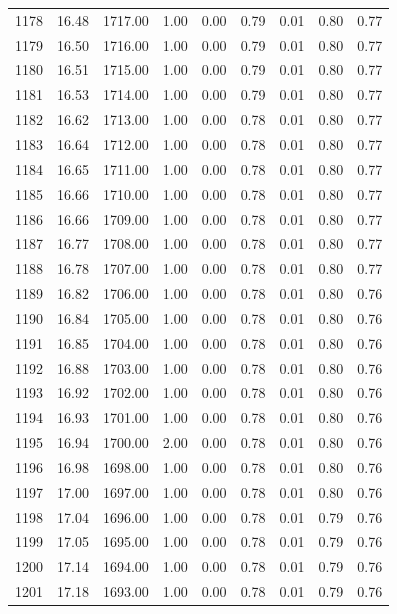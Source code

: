 \documentclass{article}\usepackage[]{graphicx}\usepackage[]{color}
\begin{document}
\begin{longtable}{rrrrrrrrr}
  1178 & 16.48 & 1717.00 & 1.00 & 0.00 & 0.79 & 0.01 & 0.80 & 0.77 \\ 
  1179 & 16.50 & 1716.00 & 1.00 & 0.00 & 0.79 & 0.01 & 0.80 & 0.77 \\ 
  1180 & 16.51 & 1715.00 & 1.00 & 0.00 & 0.79 & 0.01 & 0.80 & 0.77 \\ 
  1181 & 16.53 & 1714.00 & 1.00 & 0.00 & 0.79 & 0.01 & 0.80 & 0.77 \\ 
  1182 & 16.62 & 1713.00 & 1.00 & 0.00 & 0.78 & 0.01 & 0.80 & 0.77 \\ 
  1183 & 16.64 & 1712.00 & 1.00 & 0.00 & 0.78 & 0.01 & 0.80 & 0.77 \\ 
  1184 & 16.65 & 1711.00 & 1.00 & 0.00 & 0.78 & 0.01 & 0.80 & 0.77 \\ 
  1185 & 16.66 & 1710.00 & 1.00 & 0.00 & 0.78 & 0.01 & 0.80 & 0.77 \\ 
  1186 & 16.66 & 1709.00 & 1.00 & 0.00 & 0.78 & 0.01 & 0.80 & 0.77 \\ 
  1187 & 16.77 & 1708.00 & 1.00 & 0.00 & 0.78 & 0.01 & 0.80 & 0.77 \\ 
  1188 & 16.78 & 1707.00 & 1.00 & 0.00 & 0.78 & 0.01 & 0.80 & 0.77 \\ 
  1189 & 16.82 & 1706.00 & 1.00 & 0.00 & 0.78 & 0.01 & 0.80 & 0.76 \\ 
  1190 & 16.84 & 1705.00 & 1.00 & 0.00 & 0.78 & 0.01 & 0.80 & 0.76 \\ 
  1191 & 16.85 & 1704.00 & 1.00 & 0.00 & 0.78 & 0.01 & 0.80 & 0.76 \\ 
  1192 & 16.88 & 1703.00 & 1.00 & 0.00 & 0.78 & 0.01 & 0.80 & 0.76 \\ 
  1193 & 16.92 & 1702.00 & 1.00 & 0.00 & 0.78 & 0.01 & 0.80 & 0.76 \\ 
  1194 & 16.93 & 1701.00 & 1.00 & 0.00 & 0.78 & 0.01 & 0.80 & 0.76 \\ 
  1195 & 16.94 & 1700.00 & 2.00 & 0.00 & 0.78 & 0.01 & 0.80 & 0.76 \\ 
  1196 & 16.98 & 1698.00 & 1.00 & 0.00 & 0.78 & 0.01 & 0.80 & 0.76 \\ 
  1197 & 17.00 & 1697.00 & 1.00 & 0.00 & 0.78 & 0.01 & 0.80 & 0.76 \\ 
  1198 & 17.04 & 1696.00 & 1.00 & 0.00 & 0.78 & 0.01 & 0.79 & 0.76 \\ 
  1199 & 17.05 & 1695.00 & 1.00 & 0.00 & 0.78 & 0.01 & 0.79 & 0.76 \\ 
  1200 & 17.14 & 1694.00 & 1.00 & 0.00 & 0.78 & 0.01 & 0.79 & 0.76 \\ 
  1201 & 17.18 & 1693.00 & 1.00 & 0.00 & 0.78 & 0.01 & 0.79 & 0.76 \\ 

\end{longtable}
\end{document}
